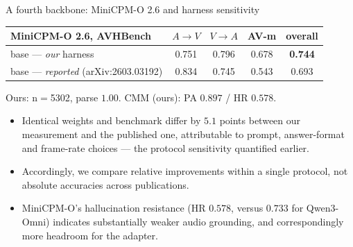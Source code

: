 \documentclass[aspectratio=169,11pt]{beamer}
\begin{document}
\begin{frame}{A fourth backbone: MiniCPM-O 2.6 and harness sensitivity}
\centering
\renewcommand{\arraystretch}{1.2}
\footnotesize
\begin{tabular}{l cccc}
\toprule
MiniCPM-O 2.6, AVHBench & $A\!\to\!V$ & $V\!\to\!A$ & AV-m & overall \\
\midrule
base --- \emph{our} harness & 0.751 & 0.796 & 0.678 & \textbf{0.744} \\
base --- \emph{reported} {\scriptsize(arXiv:2603.03192)} & 0.834 & 0.745 & 0.543 & 0.693 \\
\bottomrule
\end{tabular}
\par\vspace{0.3em}
{\scriptsize Ours: n$=$5302, parse $1.00$. CMM (ours): PA $0.897$ / HR $\mathbf{0.578}$.}
\vfill
\begin{itemize}\footnotesize
\item Identical weights and benchmark differ by $5.1$ points between our measurement and the
published one, attributable to prompt, answer-format and frame-rate choices --- the protocol
sensitivity quantified earlier.
\item Accordingly, we compare relative improvements within a single protocol, not absolute
accuracies across publications.
\item MiniCPM-O's hallucination resistance (HR $0.578$, versus $0.733$ for Qwen3-Omni) indicates
substantially weaker audio grounding, and correspondingly more headroom for the adapter.
\end{itemize}
\end{frame}
\end{document}
